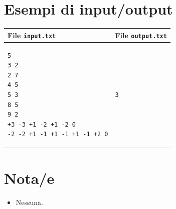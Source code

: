 \documentclass[a4paper,11pt]{article}
\begin{document}
\section*{Esempi di input/output}

  
    \noindent
    \begin{tabular}{p{11cm}|p{5cm}}
    \toprule
    \textbf{File \texttt{input.txt}}
    & \textbf{File \texttt{output.txt}}
    \\
    \midrule
    \scriptsize
    \begin{verbatim}
5
3 2
2 7
4 5
5 3
8 5
9 2
+3 -3 +1 -2 +1 -2 0
-2 -2 +1 -1 +1 -1 +1 -1 +2 0
\end{verbatim}
    &
    \scriptsize
    \begin{verbatim}
3
\end{verbatim}
    \\
    \bottomrule
    \end{tabular}
  
\section*{Nota/e}
\begin{itemize}
  
    \item  
Nessuna.

\end{itemize}
\end{document}
